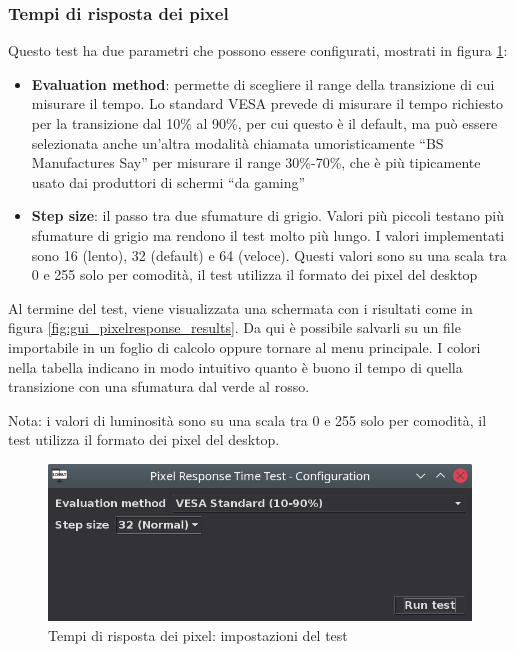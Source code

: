\subsubsection{Tempi di risposta dei pixel}
Questo test ha due parametri che possono essere configurati, mostrati in figura \ref{fig:gui_pixelresponse_settings}:\begin{itemize}
	\item \textbf{Evaluation method}: permette di scegliere il range della transizione di cui misurare il tempo. Lo standard VESA prevede di misurare il tempo richiesto per la transizione dal 10\% al 90\%, per cui questo è il default, ma può essere selezionata anche un'altra modalità chiamata umoristicamente ``BS Manufactures Say'' per misurare il range 30\%-70\%, che è più tipicamente usato dai produttori di schermi ``da gaming''
	\item \textbf{Step size}: il passo tra due sfumature di grigio. Valori più piccoli testano più sfumature di grigio ma rendono il test molto più lungo. I valori implementati sono 16 (lento), 32 (default) e 64 (veloce). Questi valori sono su una scala tra 0 e 255 solo per comodità, il test utilizza il formato dei pixel del desktop
\end{itemize}

Al termine del test, viene visualizzata una schermata con i risultati come in figura \ref{fig:gui_pixelresponse_results}. Da qui è possibile salvarli su un file importabile in un foglio di calcolo oppure tornare al menu principale. I colori nella tabella indicano in modo intuitivo quanto è buono il tempo di quella transizione con una sfumatura dal verde al rosso.

Nota: i valori di luminosità sono su una scala tra 0 e 255 solo per comodità, il test utilizza il formato dei pixel del desktop.

\begin{figure}[H]
	\centering
	\includegraphics[width=.8\textwidth]{Applicazione_files/gui_pixelresponse_settings.png}
	\caption{Tempi di risposta dei pixel: impostazioni del test}
	\label{fig:gui_pixelresponse_settings}
\end{figure}

